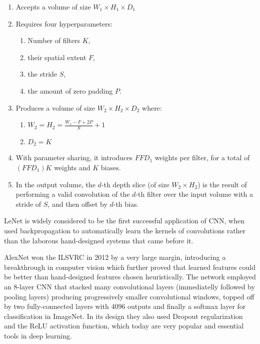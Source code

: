 \begin{enumerate}
    \item Accepts a volume of size $W_1 \times H_1 \times D_1$
    \item Requires four hyperparameters:
    \begin{enumerate}
        \item Number of filters $K$,
        \item their spatial extent $F$,
        \item the stride $S$,
        \item the amount of zero padding $P$.
    \end{enumerate}
    \item Produces a volume of size $W_2 \times H_2 \times D_2$ where:
    \begin{enumerate}
        \item $W_2 = H_2 = \frac{W_1 - F + 2P}{S} + 1$
        \item $D_2 = K$
    \end{enumerate}
    \item With parameter sharing, it introduces $F F D_1$ weights per filter, for a total of $(F F D_1) K$ weights and $K$ biases.
    \item In the output volume, the $d$-th depth slice (of size $W_2 \times H_2$) is the result of performing a valid convolution of the $d$-th filter over the input volume with a stride of $S$, and then offset by $d$-th bias.
\end{enumerate}

LeNet \cite{lenet} is widely considered to be the first successful application of \ac{CNN}, when \citeauthor{lenet} used backpropagation to automatically learn the kernels of convolutions rather than the laborous hand-designed systems that came before it.

AlexNet \cite{alexnet} won the \ac{ILSVRC} \cite{imagenet} in 2012 by a very large margin, introducing a breakthrough in computer vision which further proved that learned features could be better than hand-designed features chosen heuristically. The network employed an 8-layer \ac{CNN} that stacked many convolutional layers (immediatelly followed by pooling layers) producing progressively smaller convolutional windows, topped off by two fully-connected layers with 4096 outputs and finally a softmax layer for classification in ImageNet. In its design they also used Dropout regularization and the ReLU activation function, which today are very popular and essential tools in deep learning.

